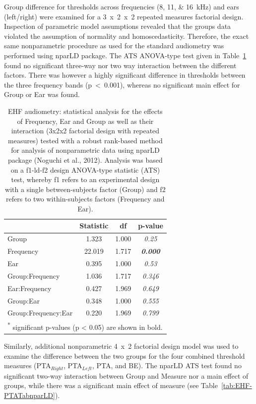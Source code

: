 \documentclass[a4paper, twoside]{templates/ociamthesis}
\begin{document}
Group difference for thresholds across frequencies (8, 11, \& 16~kHz) and ears (left/right) were examined for a 3~x~2~x~2 repeated measures factorial design. Inspection of parametric model assumptions revealed that the groups data violated the assumption of normality and homoscedasticity. Therefore, the exact same nonparametric procedure as used for the standard audiometry was performed using nparLD package. The ATS ANOVA-type test given in Table~\ref{tab:EHF-TabnparLD} found no significant three-way nor two way interaction between the different factors. There was however a highly significant difference in thresholds between the three frequency bands (p~\textless~0.001), whereas no significant main effect for Group or Ear was found.\\

\begin{table}

\caption{\label{tab:EHF-TabnparLD}EHF audiometry: statistical analysis for the effects of Frequency, Ear and Group as well as their interaction (3x2x2 factorial design with repeated measures) tested with a robust rank-based method for analysis of nonparametric data using nparLD package (Noguchi et al., 2012). Analysis was based on a f1-ld-f2 design ANOVA-type statistic (ATS) test, whereby f1 refers to an experimental design with a single between-subjects factor (Group) and f2 refers to two within-subjects factors (Frequency and Ear).}
\centering
\begin{tabular}[t]{lcc>{}c}
\toprule
  & Statistic & df & p-value\\
\midrule
Group & 1.323 & 1.000 & \em{0.25}\\
Frequency & 22.019 & 1.717 & \em{\textbf{0.000}}\\
Ear & 0.395 & 1.000 & \em{0.53}\\
Group:Frequency & 1.036 & 1.717 & \em{0.346}\\
Ear:Frequency & 0.427 & 1.969 & \em{0.649}\\
Group:Ear & 0.348 & 1.000 & \em{0.555}\\
Group:Frequency:Ear & 0.220 & 1.969 & \em{0.799}\\
\bottomrule
\multicolumn{4}{l}{\textsuperscript{*} significant p-values (p < 0.05) are shown in bold.}\\
\end{tabular}
\end{table}

Similarly, additional nonparametric 4~x~2 factorial design model was used to examine the difference between the two groups for the four combined threshold measures (PTA\(_{Right}\), PTA\(_{Left}\), PTA, and BE). The nparLD ATS test found no significant two-way interaction between Group and Measure nor a main effect of groups, while there was a significant main effect of measure (see Table~\ref{tab:EHF-PTATabnparLD}).
\end{document}
